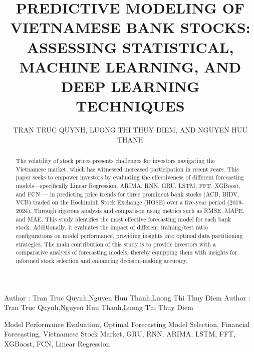\documentclass{ieeeojies}
\begin{document}
\title{PREDICTIVE MODELING OF VIETNAMESE BANK STOCKS: ASSESSING STATISTICAL, MACHINE LEARNING, AND DEEP LEARNING TECHNIQUES}

\author{\uppercase{Tran Truc Quynh},
\uppercase{Luong Thi Thuy Diem, and Nguyen Huu Thanh}}

\address[1]{Faculty of Information Systems, University of Information Technology, (e-mail: 21522539@gm.uit.edu.vn)}
\address[2]{Faculty of Information Systems, University of Information Technology, (e-mail: 21521953@gm.uit.edu.vn)}
\address[3]{Faculty of Information Systems, University of Information Technology, (e-mail: 21522599@gm.uit.edu.vn)}

\markboth
{Author \headeretal: Tran Truc Quynh,Nguyen Huu Thanh,Luong Thi Thuy Diem}
{Author \headeretal: Tran Truc Quynh,Nguyen Huu Thanh,Luong Thi Thuy Diem}

\begin{abstract}
The volatility of stock prices presents challenges for investors navigating the Vietnamese market, which has witnessed increased participation in recent years. This paper seeks to empower investors by evaluating the effectiveness of different forecasting models—specifically Linear Regression, ARIMA, RNN, GRU, LSTM, FFT, XGBoost, and FCN — in predicting price trends for three prominent bank stocks (ACB, BIDV, VCB) traded on the Hochiminh Stock Exchange (HOSE) over a five-year period (2019-2024). Through rigorous analysis and comparison using metrics such as RMSE, MAPE, and MAE. This study identifies the most effective forecasting model for each bank stock. Additionally, it evaluates the impact of different training/test ratio configurations on model performance, providing insights into optimal data partitioning strategies. The main contribution of this study is to provide investors with a comparative analysis of forecasting models, thereby equipping them with insights for informed stock selection and enhancing decision-making accuracy.

\end{abstract}

\begin{keywords}
Model Performance Evaluation, Optimal Forecasting Model Selection, Financial Forecasting, Vietnamese Stock Market, GRU, RNN, ARIMA, LSTM, FFT, XGBoost, FCN, Linear Regression.
\end{keywords}

\titlepgskip=-15pt

\maketitle
\end{document}

